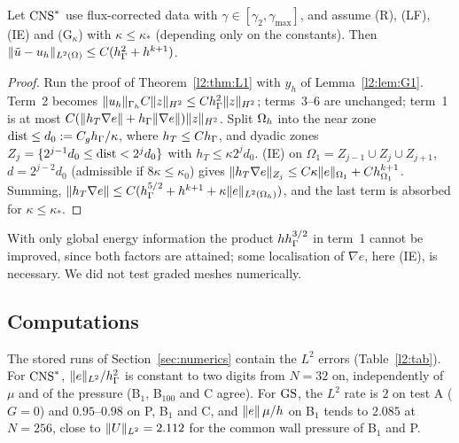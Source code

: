 \begin{theorem}\label{l2:thm:G}
Let $\mathrm{CNS}^\ast$ use flux-corrected data with $\gamma\in[\gamma_2,\gamma_{\max}]$, and assume (R), (LF), (IE) and (G$_\kappa$) with $\kappa\le\kappa_\ast$ (depending only on the constants). Then $\lVert \tilde u-u_h\rVert_{L^2(\Omega)}\le C(h_\Gamma^2+h^{k+1})$.
\end{theorem}

\begin{proof}
Run the proof of Theorem~\ref{l2:thm:L1} with $y_h$ of Lemma~\ref{l2:lem:G1}. Term~2 becomes $\lVert u_h\rVert_{\Gamma_h}C\lVert z\rVert_{H^2}\le Ch_\Gamma^2\lVert z\rVert_{H^2}$; terms~3--6 are unchanged; term~1 is at most $C(\lVert h_T\nabla e\rVert+h_\Gamma\lVert \nabla e\rVert)\lVert z\rVert_{H^2}$. Split $\Omega_h$ into the near zone $\operatorname{dist}\le d_0:=C_gh_\Gamma/\kappa$, where $h_T\le Ch_\Gamma$, and dyadic zones $Z_j=\{2^{j-1}d_0\le\operatorname{dist}<2^jd_0\}$ with $h_T\le\kappa2^jd_0$. (IE) on $\Omega_1=Z_{j-1}\cup Z_j\cup Z_{j+1}$, $d=2^{j-2}d_0$ (admissible if $8\kappa\le\kappa_0$) gives $\lVert h_T\nabla e\rVert_{Z_j}\le C\kappa\lVert e\rVert_{\Omega_1}+Ch^{k+1}_{\Omega_1}$. Summing, $\lVert h_T\nabla e\rVert\le C(h_\Gamma^{5/2}+h^{k+1}+\kappa\lVert e\rVert_{L^2(\Omega_h)})$, and the last term is absorbed for $\kappa\le\kappa_\ast$.
\end{proof}

With only global energy information the product $hh_\Gamma^{3/2}$ in term~1 cannot be improved, since both factors are attained; some localisation of $\nabla e$, here (IE), is necessary. We did not test graded meshes numerically.

\subsection{Computations}\label{l2:sec:num}

The stored runs of Section~\ref{sec:numerics} contain the $L^2$ errors (Table~\ref{l2:tab}). For $\mathrm{CNS}^\ast$, $\lVert e\rVert_{L^2}/h_\Gamma^2$ is constant to two digits from $N=32$ on, independently of $\mu$ and of the pressure (B$_1$, B$_{100}$ and C agree). For $\mathrm{GS}$, the $L^2$ rate is $2$ on test A ($G=0$) and $0.95$--$0.98$ on P, B$_1$ and C, and $\lVert e\rVert\,\mu/h$ on B$_1$ tends to $2.085$ at $N=256$, close to $\lVert U\rVert_{L^2}=2.112$ for the common wall pressure of B$_1$ and P.

